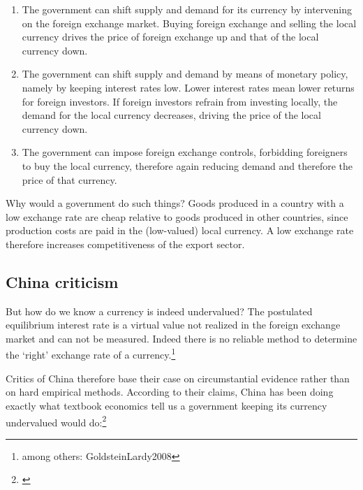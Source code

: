 \documentclass[11pt]{article}
\begin{document}
\begin{enumerate}
\item{The government can shift supply and demand for its currency by intervening on the foreign exchange market. Buying foreign exchange and selling the local currency drives the price of foreign exchange up and that of the local currency down.}
\item{The government can shift supply and demand by means of monetary policy, namely by keeping interest rates low. Lower interest rates mean lower returns for foreign investors. If foreign investors refrain from investing locally, the demand for the local currency decreases, driving the price of the local currency down.}
\item{The government can impose foreign exchange controls, forbidding foreigners to buy the local currency, therefore again reducing demand and therefore the price of that currency.}
\end{enumerate}

Why would a government do such things? Goods produced in a country with a low exchange rate are cheap relative to goods produced in other countries, since production costs are paid in the (low-valued) local currency. A low exchange rate therefore increases competitiveness of the export sector. 


\subsection{China criticism}

But how do we know a currency is indeed undervalued? The postulated equilibrium interest rate is a virtual value not realized in the foreign exchange market and can not be measured. Indeed there is no reliable method to determine the `right' exchange rate of a currency.\footnote{among others: \cite{pp. 4}{GoldsteinLardy2008}}

Critics of China therefore base their case on circumstantial evidence rather than on hard empirical methods. %
According to their claims, China has been doing exactly what textbook economics tell us a government keeping its currency undervalued would do:\footnote{\cite[pp. 40]{GoldsteinLardy2008}}
\end{document}
